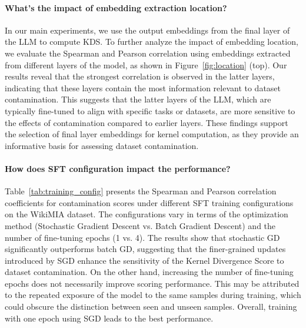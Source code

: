 \paragraph{What's the impact of embedding extraction location?}
In our main experiments, we use the output embeddings from the final layer of the LLM to compute KDS. 
To further analyze the impact of embedding location, we evaluate the Spearman and Pearson correlation using embeddings extracted from different layers of the model, as shown in Figure~\ref{fig:location} (top).
Our results reveal that the strongest correlation is observed in the latter layers, indicating that these layers contain the most information relevant to dataset contamination. This suggests that the latter layers of the LLM, which are typically fine-tuned to align with specific tasks or datasets, are more sensitive to the effects of contamination compared to earlier layers.
These findings support the selection of final layer embeddings for kernel computation, as they provide an informative basis for assessing dataset contamination.




\paragraph{How does SFT configuration impact the performance?}
Table~\ref{tab:training_config} presents the Spearman and Pearson correlation coefficients for contamination scores under different SFT training configurations on the WikiMIA dataset. 
The configurations vary in terms of the optimization method (Stochastic Gradient Descent vs. Batch Gradient Descent) and the number of fine-tuning epochs (1 vs. 4).
The results show that stochastic GD significantly outperforms batch GD, suggesting that the finer-grained updates introduced by SGD enhance the sensitivity of the Kernel Divergence Score to dataset contamination. 
On the other hand, increasing the number of fine-tuning epochs does not necessarily improve scoring performance.
This may be attributed to the repeated exposure of the model to the same samples during training, which could obscure the distinction between seen and unseen samples. 
Overall, training with one epoch using SGD leads to the best performance. 


